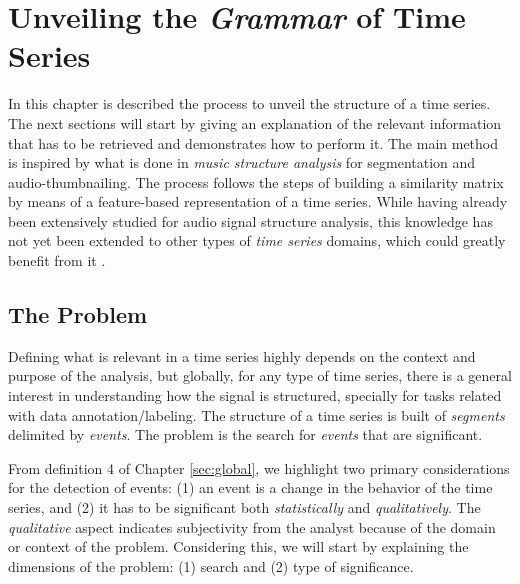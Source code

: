 
%

\chapter{Unveiling the \textit{Grammar} of Time Series}
\label{cha:methods1}

In this chapter is described the process to unveil the structure of a time series. The next sections will start by giving an explanation of the relevant information that has to be retrieved and demonstrates how to perform it. The main method is inspired by what is done in \textit{music structure analysis} for segmentation and audio-thumbnailing. The process follows the steps of building a similarity matrix by means of a feature-based representation of a time series. While having already been extensively studied for audio signal structure analysis\cite{Mueller15_FMP_SPRINGER, audiolabs1, audiolabs2, cpd_audio}, this knowledge has not yet been extended to other types of \textit{time series} domains, which could greatly benefit from it \cite{muller_music_health}.

\section{The Problem}

Defining what is relevant in a time series highly depends on the context and purpose of the analysis, but globally, for any type of time series, there is a general interest in understanding how the signal is structured, specially for tasks related with data annotation/labeling. The structure of a time series is built of \textit{segments} delimited by \textit{events}. The problem is the search for \textit{events} that are significant. 
\par
From definition 4 of Chapter \ref{sec:global}, we highlight two primary considerations for the detection of events: (1) an event is a change in the behavior of the time series, and (2) it has to be significant both \textit{statistically} and \textit{qualitatively}. The \textit{qualitative} aspect indicates subjectivity from the analyst because of the domain or context of the problem. Considering this, we will start by explaining the dimensions of the problem: (1) search and (2) type of significance. 

